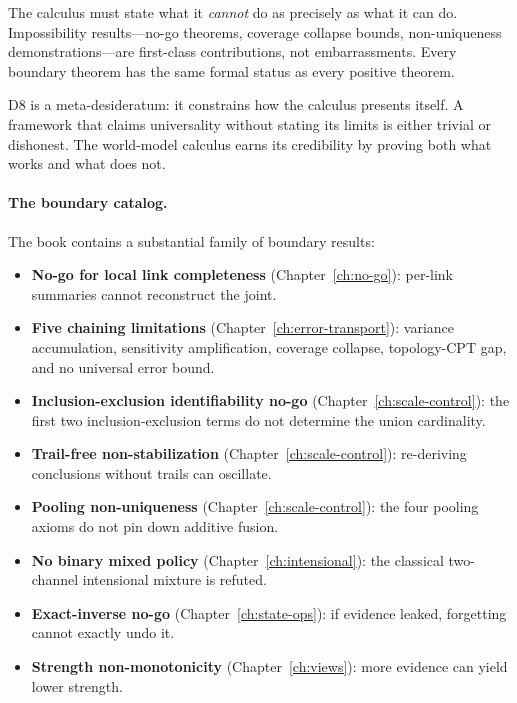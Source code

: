 \begin{definition}
\label{def:d8}
The calculus must state what it \emph{cannot} do as precisely as what
it can do.  Impossibility results---no-go theorems, coverage collapse
bounds, non-uniqueness demonstrations---are first-class contributions,
not embarrassments.  Every boundary theorem has the same formal status
as every positive theorem.
\end{definition}

\noindent
D8 is a meta-desideratum: it constrains how the calculus presents
itself.  A framework that claims universality without stating its
limits is either trivial or dishonest.  The world-model calculus earns
its credibility by proving both what works and what does not.

\paragraph{The boundary catalog.}
The book contains a substantial family of boundary results:
\begin{itemize}
\item \textbf{No-go for local link completeness}
  (Chapter~\ref{ch:no-go}): per-link summaries cannot reconstruct
  the joint.
\item \textbf{Five chaining limitations}
  (Chapter~\ref{ch:error-transport}): variance accumulation,
  sensitivity amplification, coverage collapse, topology-CPT gap,
  and no universal error bound.
\item \textbf{Inclusion-exclusion identifiability no-go}
  (Chapter~\ref{ch:scale-control}): the first two
  inclusion-exclusion terms do not determine the union cardinality.
\item \textbf{Trail-free non-stabilization}
  (Chapter~\ref{ch:scale-control}): re-deriving conclusions without
  trails can oscillate.
\item \textbf{Pooling non-uniqueness}
  (Chapter~\ref{ch:scale-control}): the four pooling axioms do not
  pin down additive fusion.
\item \textbf{No binary mixed policy}
  (Chapter~\ref{ch:intensional}): the classical two-channel
  intensional mixture is refuted.
\item \textbf{Exact-inverse no-go}
  (Chapter~\ref{ch:state-ops}): if evidence leaked, forgetting
  cannot exactly undo it.
\item \textbf{Strength non-monotonicity}
  (Chapter~\ref{ch:views}): more evidence can yield lower strength.
\end{itemize}

